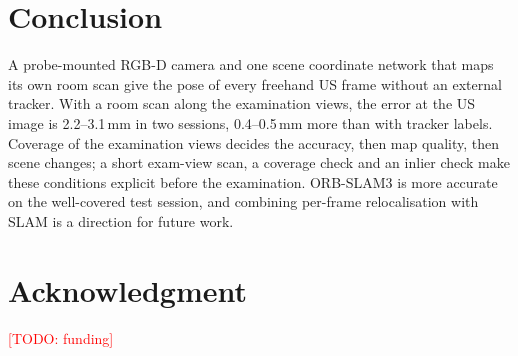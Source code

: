\documentclass[journal]{IEEEtran}
\newcommand{\tbd}[1]{\textcolor{red}{[TODO: #1]}}
\begin{document}
\section{Conclusion}
A probe-mounted RGB-D camera and one scene coordinate network that maps its own room scan give the pose of every freehand US frame without an external tracker. With a room scan along the examination views, the error at the US image is 2.2--3.1\,mm in two sessions, 0.4--0.5\,mm more than with tracker labels. Coverage of the examination views decides the accuracy, then map quality, then scene changes; a short exam-view scan, a coverage check and an inlier check make these conditions explicit before the examination. ORB-SLAM3 is more accurate on the well-covered test session, and combining per-frame relocalisation with SLAM is a direction for future work.

\section*{Acknowledgment}
\tbd{funding}



\end{document}
